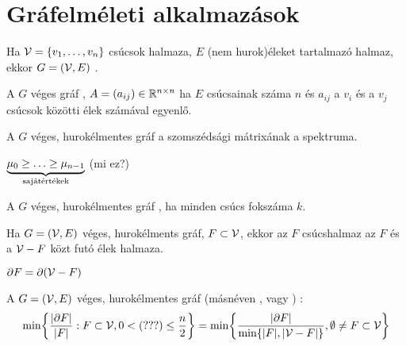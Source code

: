 \section{Gráfelméleti alkalmazások}
\begin{ff}
	Ha $\mathcal{V}=\{v_1,\ldots,v_n\}$ csúcsok halmaza, $E$ (nem hurok)éleket
	tartalmazó halmaz, ekkor $G=(\mathcal{V},E)$ .
\end{ff}

\begin{ff}
	A $G$ véges gráf ,
	$A=(a_{ij})\in\mathbb{R}^{n\times n}$ ha $E$ csúcsainak száma $n$ és $a_{ij}$ a $v_i$ és a
	$v_j$ csúcsok közötti élek számával egyenlő.
\end{ff}

\begin{ff}
	A $G$ véges, hurokélmentes gráf  a szomszédsági mátrixának
	a spektruma.
\end{ff}

\begin{jel}
	$\underbrace{\mu_0\ge\ldots\ge\mu_{n-1}}_{\text{sajátértékek}}$ (mi ez?)
\end{jel}

\begin{ff}
	A $G$ véges, hurokélmentes gráf , ha minden csúcs fokszáma
	$k$.
\end{ff}

\begin{ff}
	Ha $G=(\mathcal{V},E)$ véges, hurokélments gráf, $F\subset\mathcal{V}$, ekkor az $F$
	csúcshalmaz  az $F$ és a $\mathcal{V}-F$ közt futó élek halmaza.
\end{ff}

\begin{jel}
\end{jel}

\begin{megj}
	$\partial F=\partial(\mathcal{V}-F)$
\end{megj}

\begin{ff}
	A $G=(\mathcal{V},E)$ véges, hurokélmentes gráf  (másnéven
	, vagy ) :
	\begin{equation*}
		\min\hz*{\f{\abs{\partial
		F}}{\abs{F}}:F\subset\V,0<\text{(???)}\leq\f{n}{2}}=
		\min\hz*{\f{\abs{\partial
		F}}{\min\hz*{\abs{F},\abs{\V-F}}},\emptyset\neq F\subset\V}
	\end{equation*}
\end{ff}

